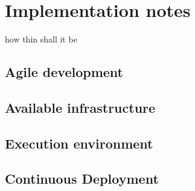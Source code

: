 \chapter{Implementation notes}


how thin shall it be

\section{Agile development}

\section{Available infrastructure}

\section{Execution environment}

\section{Continuous Deployment}